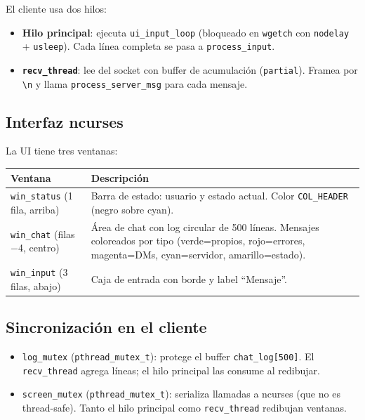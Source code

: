 \documentclass[12pt,a4paper]{article}
\begin{document}
El cliente usa dos hilos:

\begin{itemize}[nosep]
    \item \textbf{Hilo principal}: ejecuta \texttt{ui\_input\_loop} (bloqueado en
          \texttt{wgetch} con \texttt{nodelay} + \texttt{usleep}).  Cada línea
          completa se pasa a \texttt{process\_input}.
    \item \textbf{\texttt{recv\_thread}}: lee del socket con buffer de
          acumulación (\texttt{partial}).  Framea por \texttt{\textbackslash n} y
          llama \texttt{process\_server\_msg} para cada mensaje.
\end{itemize}

\subsection{Interfaz ncurses}

La UI tiene tres ventanas:

\begin{center}
\begin{tabular}{lp{8cm}}
\toprule
\textbf{Ventana} & \textbf{Descripción} \\
\midrule
\texttt{win\_status} (1 fila, arriba) & Barra de estado: usuario y estado actual.  Color \texttt{COL\_HEADER} (negro sobre cyan). \\
\texttt{win\_chat} (filas$-$4, centro)  & Área de chat con log circular de 500 líneas.  Mensajes coloreados por tipo (verde=propios, rojo=errores, magenta=DMs, cyan=servidor, amarillo=estado). \\
\texttt{win\_input} (3 filas, abajo)   & Caja de entrada con borde y label ``Mensaje''. \\
\bottomrule
\end{tabular}
\end{center}

\subsection{Sincronización en el cliente}

\begin{itemize}[nosep]
    \item \texttt{log\_mutex} (\texttt{pthread\_mutex\_t}): protege el buffer
          \texttt{chat\_log[500]}.  El \texttt{recv\_thread} agrega líneas; el
          hilo principal las consume al redibujar.
    \item \texttt{screen\_mutex} (\texttt{pthread\_mutex\_t}): serializa llamadas
          a ncurses (que no es thread-safe).  Tanto el hilo principal como
          \texttt{recv\_thread} redibujan ventanas.
\end{itemize}
\end{document}
